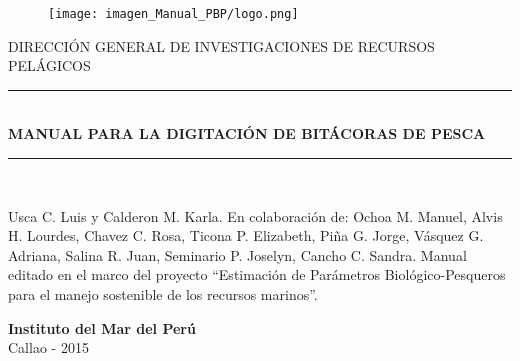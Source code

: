 \documentclass[a4paper,oneside,11pt]{book}
\begin{document}
\begin{titlepage}


\begin{figure}
\centering
\texttt{[image: imagen\_Manual\_PBP/logo.png]}
\end{figure}


\begin{center}
\vspace*{0.1in}
\large {DIRECCIÓN GENERAL DE INVESTIGACIONES DE RECURSOS PELÁGICOS} \\ 

\end{center}

\vspace*{0.6in}
\begin{large}
\end{large}
\vspace*{0.2in}
\begin{Large}
\begin{center}
\rule{150mm}{0.3mm}\\
\huge {\textbf{MANUAL PARA LA DIGITACIÓN DE BITÁCORAS DE PESCA}} \\
\rule{150mm}{0.3mm}\\
\end{center}
\end{Large}
\vspace*{0.1in}
\begin{large}
\end{large}
\vspace{60pt}

\noindent
\small{Usca C. Luis y Calderon M. Karla. En colaboración de: Ochoa M. Manuel, Alvis H. Lourdes, Chavez C. Rosa, Ticona P. Elizabeth, Piña G. Jorge, Vásquez G. Adriana, Salina R. Juan, Seminario P. Joselyn, Cancho C. Sandra.
Manual editado en el marco del proyecto “Estimación de Parámetros Biológico-Pesqueros para el manejo sostenible de los recursos marinos”.}\\
\vspace{10pt}
\begin{center}
\vspace*{0.1in}
\vspace*{0.1in}

\begin{large}
\Large {\textbf{Instituto del Mar del Perú} \vspace{5pt}\\ Callao - 2015}
\end{large}
\end{center}
\end{titlepage}
\end{document}
